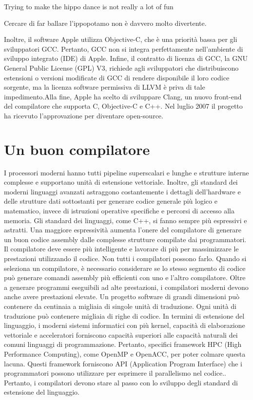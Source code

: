 \documentclass[12pt,a4paper]{report}
\begin{document}
\begin{center}
Trying to make the hippo dance is not really a lot of fun\\
 \begin{footnotesize}
 	Cercare di far ballare l'ippopotamo non è davvero molto divertente.
 \end{footnotesize}
 	
\end{center}

Inoltre, il software Apple utilizza Objective-C, che è una priorità bassa per gli sviluppatori GCC. Pertanto, GCC non si integra perfettamente nell'ambiente di sviluppo integrato (IDE) di Apple. Infine, il contratto di licenza di GCC, la GNU General Public License (GPL) V3, richiede agli sviluppatori che distribuiscono estensioni o versioni modificate di GCC di rendere disponibile il loro codice sorgente, ma la licenza software permissiva di LLVM è priva di tale impedimento.Alla fine, Apple ha scelto di sviluppare Clang, un nuovo front-end del compilatore che supporta C, Objective-C e C++. Nel luglio 2007 il progetto ha ricevuto l'approvazione per diventare open-source.


\section{Un buon compilatore}
I processori moderni hanno tutti pipeline superscalari e lunghe e strutture interne complesse e supportano unità di estensione vettoriale. Inoltre, gli standard dei moderni linguaggi avanzati astraggono costantemente i dettagli dell'hardware e delle strutture dati sottostanti per generare codice generale più logico e matematico, invece di istruzioni operative specifiche e percorsi di accesso alla memoria. Gli standard dei linguaggi, come C++, si fanno  sempre più espressivi e astratti. Una maggiore espressività aumenta l'onere del compilatore di generare un buon codice assembly dalle complesse strutture compilate dai programmatori. Il compilatore deve essere più intelligente e lavorare di più per massimizzare le prestazioni utilizzando il codice. Non tutti i compilatori possono farlo. Quando si seleziona un compilatore,  è necessario considerare se lo stesso segmento di codice può generare comandi assembly più efficienti con uno e l'altro compilatore.
Oltre a generare programmi eseguibili ad alte prestazioni, i compilatori moderni devono anche avere prestazioni elevate. Un progetto software di grandi dimensioni  può contenere da centinaia a migliaia di singole unità di traduzione. Ogni unità di traduzione può contenere migliaia di righe di codice. 
In termini di estensione del linguaggio, i moderni sistemi informatici con più kernel, capacità di elaborazione vettoriale e acceleratori forniscono capacità superiori alle capacità naturali dei comuni linguaggi di programmazione. Pertanto, specifici framework HPC (High Performance Computing), come OpenMP e OpenACC, per poter colmare questa lacuna. Questi framework forniscono API (Application Program Interface) che i programmatori possono utilizzare per esprimere il parallelismo nel codice.. Pertanto, i compilatori devono stare al passo con lo sviluppo degli standard di estensione del linguaggio.
\end{document}
